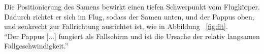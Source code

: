 Die Positionierung des Samens bewirkt einen tiefen Schwerpunkt vom Flugkörper.
Dadurch richtet er sich im Flug, sodass der Samen unten, und der Pappus oben,
und senkrecht zur Fallrichtung ausrichtet ist, wie in Abbildung ~\ref{fig:flt}.\\
\enquote{Der Pappus [...] fungiert als Fallschirm und ist die Ursache der relativ langsamen Fallgeschwindigkeit.}

\newpage